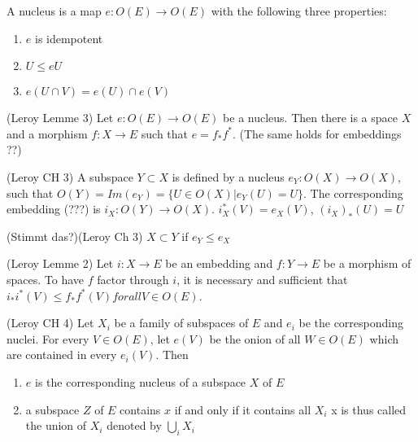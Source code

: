 \begin{definition}[Nucleus]
    \label{def:nucleus}
    \leanok
    A nucleus is a map $e : O(E) \rightarrow O(E)$ with the following three properties:
    \begin{enumerate}
        \item $e$ is idempotent
        \item $U \le e U$
        \item $e(U \cap V) = e(U) \cap e(V)$
    \end{enumerate}
\end{definition}

\begin{lemma}[Nucleus]
(Leroy Lemme 3)
    \label{lem:nucleus}
    Let $e : O(E) \rightarrow O(E)$ be a nucleus. Then there is a space $X$ and a morphism $f: X \rightarrow E$ such that $e = f_*f^*$. (The same holds for embeddings ??)
\end{lemma}

\begin{definition}[Subframe]
(Leroy CH 3)
    \label{lem:subframe}
    A subspace $Y \subset X$ is defined by a nucleus $e_Y: O(X) \rightarrow O(X)$, such that $O(Y) = Im(e_Y) = \{U \in O(X) | e_Y(U) = U\}$.
    The corresponding embedding (???) is $i_X : O(Y) \rightarrow O(X)$. $i^*_X(V) = e_X(V)$, $(i_X)_*(U) = U$
\end{definition}

\begin{definition}
(Stimmt das?)(Leroy Ch 3)
    \label{def:subframe_inclusion}
    $X \subset Y$ if $e_Y \le e_X$
\end{definition}

\begin{lemma}[factorisation]
(Leroy Lemme 2)
    \label{lem:factorisation}
    Let $i : X \rightarrow E$ be an embedding and $f: Y \rightarrow E$ be a morphism of spaces. To have $f$ factor through $i$, it is necessary and sufficient that $i_*i^*(V) \le f_*f^*(V) for all V \in O(E)$.
\end{lemma}


\begin{lemma}
(Leroy CH 4)
    \label{lem:family_of_subspaces}
    Let $X_i$ be a family of subspaces of $E$ and $e_i$ be the corresponding nuclei. For every $V \in O(E)$, let $e(V)$ be the onion of all $W \in O(E)$ which are contained in every $e_i(V)$. Then \\
    \begin{enumerate}
        \item $e$ is the corresponding nucleus of a subspace $X$ of $E$
        \item a subspace $Z$ of $E$ contains $x$ if and only if it contains all $X_i$ x is thus called the union of $X_i$ denoted by $\bigcup_i X_i$
    \end{enumerate}
\end{lemma}

